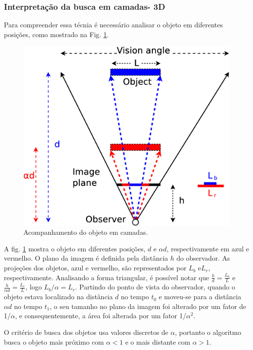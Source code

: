 

\subsubsection{Interpretação da busca em camadas- 3D}

Para compreender essa técnia é necessário analisar o objeto 
em diferentes posições, como mostrado na Fig. \ref{fig:multiscale3d}.

\begin{figure}[H]
\centering
  \includegraphics[width=.7\columnwidth]{images/Diagrama3.eps}
  \caption{ Acompanhamento do objeto em camadas.}
  \label{fig:multiscale3d}
\end{figure}

A fig. \ref{fig:multiscale3d} mostra o objeto em diferentes posições, 
$d$ e $\alpha d$, respectivamente em azul e vermelho.
O plano da imagem é definida pela distância $h$ do observador. As projeções dos objetos,
azul e vermelho, são representados por $L_b$ e$L_r$, respectivamente. Analisando a forma
triangular, é possível notar que $\frac{h}{d}=\frac{L_b}{L}$ e $\frac{h}{\alpha d}=\frac{L_r}{L}$, logo 
$L_b/\alpha= L_r$. 
Partindo do ponto de vista do observador, quando o objeto estava localizado na distância $d$ no tempo
$t_0$ e moveu-se para a distância $\alpha d$ no tempo $t_1$, o seu tamanho no plano da imagem 
foi alterado por um fator de 1/$\alpha$, e consequentemente, a área foi alterada por um fator 1/$\alpha^2$.

O critério de busca dos objetos usa valores discretos de $\alpha$, portanto o algoritmo busca o objeto
mais próximo com $\alpha<1$ e o mais distante com $\alpha>1$.



